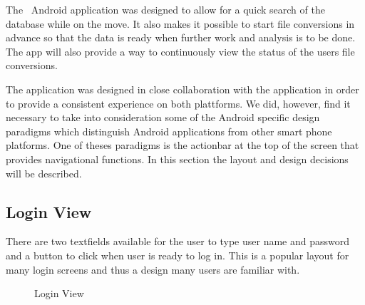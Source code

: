 


The \appName\ Android application was designed to allow for a quick search of the database while on the move. It also makes it possible to start file conversions in advance so that the data is ready when further work and analysis is to be done. The app will also provide a way to continuously view the status of the users file conversions. 

The application was designed in close collaboration with the  application in order to provide a consistent experience on both plattforms.  We did, however, find it necessary to take into consideration some of the Android specific design paradigms which distinguish Android applications from other smart phone platforms. One of theses paradigms is the actionbar at the top of the screen that provides navigational functions. In this section the layout and design decisions will be described.


\subsection{Login View}
There are two textfields available for the user to type user name and password and a button to click when user is ready to log in.
This is a popular layout for many login screens and thus a design many users are familiar with.


\begin{figure}[ht]
\caption{Login View}
\label{fig:and_login}
\end{figure}
\FloatBarrier

